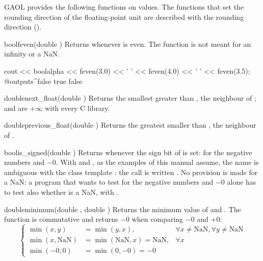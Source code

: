 GAOL provides the following functions on  values. The functions
that set the rounding direction of the floating-point unit are described with
the rounding direction ().

\begin{deffun}{bool}{feven}{(double )}
  Returns  whenever  is even. The function is not meant for
  an infinity or a NaN.

  \begin{example}
cout << boolalpha << feven(3.0) << ' ' << feven(4.0) << ' ' << feven(3.5);
@outputs^false true false~
  \end{example}
\end{deffun}

\begin{deffun}{double}{next\_float}{(double )}
  Returns the smallest  greater than , the neighbour
   of ;  and  are
  $+\infty$ with every C library.
\end{deffun}

\begin{deffun}{double}{previous\_float}{(double )}
  Returns the greatest  smaller than , the neighbour
   of .
\end{deffun}

\begin{deffun}{bool}{is\_signed}{(double )}
  Returns  whenever the sign bit of  is set: for the negative numbers and $-0$. With  and , as the examples of this manual assume, the name is ambiguous with the class template : the call is written . No provision is made for a
  NaN: a program that wants to test for the negative numbers and $-0$ alone
  has to test also whether  is a NaN, with .
\end{deffun}

\begin{deffun}{double}{minimum}{(double , double )}
  Returns the minimum  value of  and . The
  function is commutative and returns $-0$ when comparing $-0$ and $+0$:
\begin{equation*}
\left\{\begin{array}{lll}
  \min(x,y) &=\min(y,x), &\forall x\neq\text{NaN}, \forall y\neq\text{NaN}\\
  \min(x,\text{NaN}) &=\min(\text{NaN},x)=\text{NaN}, &\forall x\\
  \min(-0,0) &=\min(0,-0)=-0
\end{array}\right.
\end{equation*}
\end{deffun}

